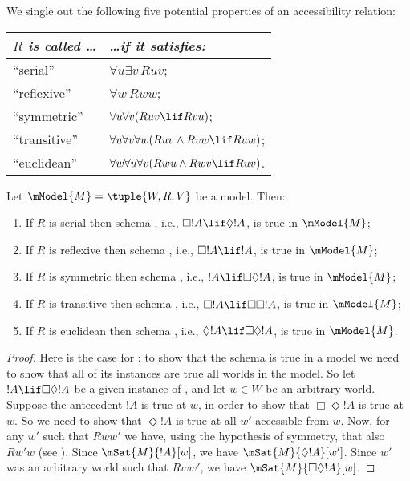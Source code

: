\documentclass[../../../include/open-logic-section]{subfiles}
\begin{document}


\begin{defn}
  We single out the following five potential properties of an
  accessibility relation:
 \begin{center}
    \begin{tabular}{| l || l |}
      \hline
      {\emph{$R$ is called \dots}} & {\emph{\dots if it satisfies:}} \\
      \hline \hline
      ``serial''   & $\forall u \exists v\, Ruv$; \\
      \hline
      ``reflexive'' & $\forall w \, Rww$; \\
      \hline
      ``symmetric'' & $\forall u\forall v(Ruv \lif Rvu)$; \\
      \hline
      ``transitive'' & $ \forall u \forall v \forall w (Ruv \land Rvw
      \lif Ruw)$; \\
      \hline 
      ``euclidean'' & $ \forall w \forall u \forall v (Rwu \land Rwv
      \lif Ruv)$.\\
      \hline
    \end{tabular}
  \end{center}
\end{defn}

\begin{thm}
  Let $\mModel{M} = \tuple{W, R, V}$ be a model. Then:
 \begin{enumerate}
 \item If $R$ is serial then schema , i.e., $\Box !A \lif
   \Diamond !A$, is true in $\mModel{M}$;
 \item If $R$ is reflexive then schema , i.e., $\Box !A \lif
   !A$, is true in $\mModel{M}$;
 \item If $R$ is symmetric then schema , i.e., $!A \lif
   \Box\Diamond !A$, is true in $\mModel{M}$;
 \item If $R$ is transitive then schema , i.e., $\Box
   !A \lif \Box \Box !A$, is true in $\mModel{M}$;
 \item If $R$ is euclidean then schema , i.e., $\Diamond
   !A \lif \Box \Diamond !A$, is true in $\mModel{M}$.
  \end{enumerate}
\end{thm}

\begin{proof}
  Here is the case for : to show that the schema is true in a
  model we need to show that all of its instances are true all worlds
  in the model. So let $!A \lif \Box\Diamond !A$ be a given instance
  of , and let $w \in W$ be an arbitrary world. Suppose the
  antecedent $!A$ is true at $w$, in order to show that $\Box \Diamond
  !A$ is true at $w$. So we need to show that $\Diamond !A$ is true at
  all $w'$ accessible from $w$. Now, for any $w'$ such that $Rww'$ we
  have, using the hypothesis of symmetry, that also $Rw'w$ (see
  ). Since $\mSat{M}{!A}[w]$, we have
  $\mSat{M}{\Diamond !A}[w']$. Since $w'$ was an arbitrary world such
  that $Rww'$, we have $\mSat{M}{\Box\Diamond!A}[w]$.
\end{proof}
\end{document}
